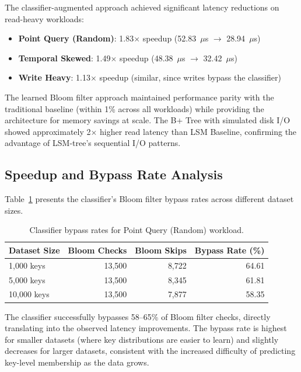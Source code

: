 \documentclass{mnitjaipur}
\begin{document}
The classifier-augmented approach achieved significant latency reductions on read-heavy workloads:

\begin{itemize}
    \item \textbf{Point Query (Random)}: 1.83$\times$ speedup (52.83~$\mu$s $\rightarrow$ 28.94~$\mu$s)
    \item \textbf{Temporal Skewed}: 1.49$\times$ speedup (48.38~$\mu$s $\rightarrow$ 32.42~$\mu$s)
    \item \textbf{Write Heavy}: 1.13$\times$ speedup (similar, since writes bypass the classifier)
\end{itemize}

The learned Bloom filter approach maintained performance parity with the traditional baseline (within 1\% across all workloads) while providing the architecture for memory savings at scale. The B+ Tree with simulated disk I/O showed approximately 2$\times$ higher read latency than LSM Baseline, confirming the advantage of LSM-tree's sequential I/O patterns.

\subsection{Speedup and Bypass Rate Analysis}

Table~\ref{tab:bypass-analysis} presents the classifier's Bloom filter bypass rates across different dataset sizes.

\begin{table}[h]
    \centering
    \begin{tabular}{lrrr}
        \toprule
        \textbf{Dataset Size} & \textbf{Bloom Checks} & \textbf{Bloom Skips} & \textbf{Bypass Rate (\%)} \\
        \midrule
        1,000 keys  & 13,500 & 8,722  & 64.61 \\
        5,000 keys  & 13,500 & 8,345  & 61.81 \\
        10,000 keys & 13,500 & 7,877  & 58.35 \\
        \bottomrule
    \end{tabular}
    \caption{Classifier bypass rates for Point Query (Random) workload.}
    \label{tab:bypass-analysis}
\end{table}

The classifier successfully bypasses 58--65\% of Bloom filter checks, directly translating into the observed latency improvements. The bypass rate is highest for smaller datasets (where key distributions are easier to learn) and slightly decreases for larger datasets, consistent with the increased difficulty of predicting key-level membership as the data grows.
\end{document}
